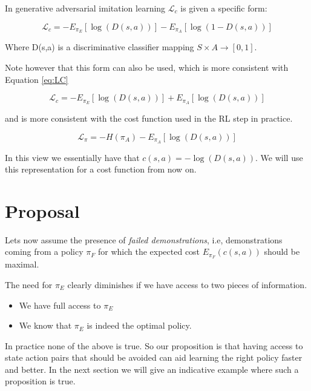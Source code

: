 \documentclass[letterpaper, 10 pt, conference]{ieeeconf}
\begin{document}
In generative adversarial imitation learning $\mathcal{L}_c$  is given a specific form:

\begin{equation}
  \mathcal{L}_c = -E_{\pi_E}[\log(D(s,a))] - E_{\pi_A}[\log(1- D(s,a))] \label{eq:LCgail}
\end{equation}

Where D(s,a) is a discriminative classifier mapping $S\times A \rightarrow [0,1]$.

Note however that this form can also be used, which is more consistent with Equation \ref{eq:LC}

\begin{equation}
  \mathcal{L}_c = -E_{\pi_E}[\log(D(s,a))] + E_{\pi_A}[\log(D(s,a))] \label{eq:LCgail2}
\end{equation}

and is more consistent with the cost function used in the RL step in practice.

\begin{equation}
  \mathcal{L}_{\pi} = -H(\pi_A) - E_{\pi_A}[\log(D(s,a))] \label{eq:LPgail}
\end{equation}

In this view we essentially have that $c(s,a) = -\log(D(s,a))$. We will use this representation for a cost function from now on.


\section{Proposal}

Lets now assume the presence of \emph{failed demonstrations}, i.e, demonstrations coming from a policy $\pi_F$ for which the expected cost $E_{\pi_F}(c(s,a))$ should be maximal.

The need for $\pi_E$ clearly diminishes if we have access to two pieces of information.

\begin{itemize}
    \item We have full access to $\pi_E$
    \item We know that $\pi_E$ is indeed the optimal policy.
\end{itemize}

In practice none of the above is true. So our proposition is that having access to state action pairs that should be avoided can aid learning the right policy faster and better. In the next section we will give an indicative example where such a proposition is true.
\end{document}
